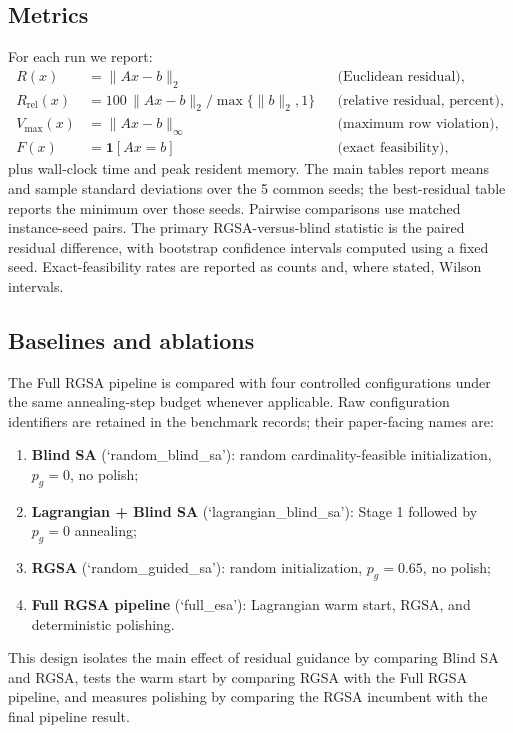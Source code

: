 \documentclass[11pt]{article}
\begin{document}
\subsection{Metrics}
For each run we report:
\begin{align}
 R(x)&=\|Ax-b\|_2 &&\text{(Euclidean residual)},\nonumber\\
 R_{\mathrm{rel}}(x)&=100\,\|Ax-b\|_2/\max\{\|b\|_2,1\} &&\text{(relative residual, percent)},\nonumber\\
 V_{\max}(x)&=\|Ax-b\|_\infty &&\text{(maximum row violation)},\nonumber\\
 F(x)&=\mathbf{1}[Ax=b] &&\text{(exact feasibility)},\label{eq:metrics}
\end{align}
plus wall-clock time and peak resident memory. The main tables report means and sample standard deviations over the 5 common seeds; the best-residual table reports the minimum over those seeds. Pairwise comparisons use matched instance-seed pairs. The primary RGSA-versus-blind statistic is the paired residual difference, with bootstrap confidence intervals computed using a fixed seed. Exact-feasibility rates are reported as counts and, where stated, Wilson intervals.

\subsection{Baselines and ablations}
The Full RGSA pipeline is compared with four controlled configurations under the same annealing-step budget whenever applicable. Raw configuration identifiers are retained in the benchmark records; their paper-facing names are:
\begin{enumerate}
  \item \textbf{Blind SA} (`random\_blind\_sa'): random cardinality-feasible initialization, $p_g=0$, no polish;
  \item \textbf{Lagrangian + Blind SA} (`lagrangian\_blind\_sa'): Stage 1 followed by $p_g=0$ annealing;
  \item \textbf{RGSA} (`random\_guided\_sa'): random initialization, $p_g=0.65$, no polish;
  \item \textbf{Full RGSA pipeline} (`full\_esa'): Lagrangian warm start, RGSA, and deterministic polishing.
\end{enumerate}
This design isolates the main effect of residual guidance by comparing Blind SA and RGSA, tests the warm start by comparing RGSA with the Full RGSA pipeline, and measures polishing by comparing the RGSA incumbent with the final pipeline result.
\end{document}
